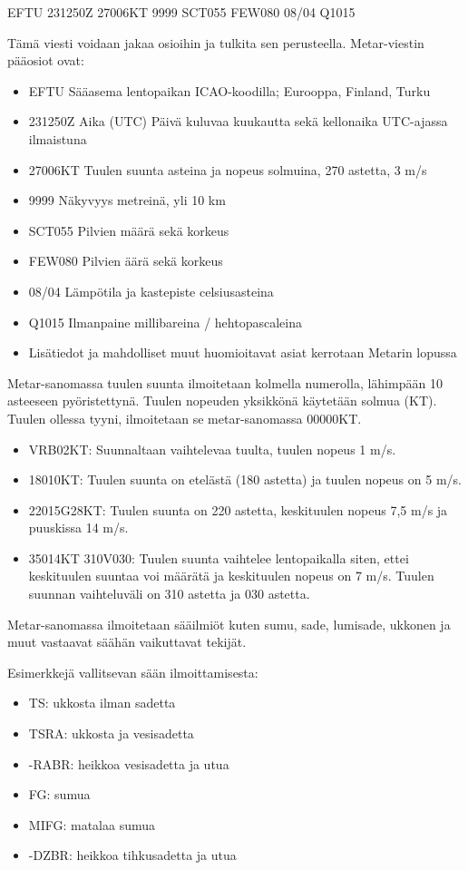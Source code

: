 EFTU 231250Z 27006KT 9999 SCT055 FEW080 08/04 Q1015 


Tämä viesti voidaan jakaa osioihin ja tulkita sen perusteella. Metar-viestin pääosiot ovat: 

\begin{itemize}
\item  EFTU Sääasema lentopaikan ICAO-koodilla; Eurooppa, Finland, Turku 
\item  231250Z Aika (UTC) Päivä kuluvaa kuukautta sekä kellonaika UTC-ajassa ilmaistuna  
\item  27006KT Tuulen suunta asteina ja nopeus solmuina, 270 astetta, 3 m/s  
\item  9999 Näkyvyys metreinä, yli 10 km 
\item  SCT055 Pilvien määrä sekä korkeus 
\item  FEW080 Pilvien äärä sekä korkeus  
\item  08/04 Lämpötila ja kastepiste celsiusasteina  
\item  Q1015 Ilmanpaine millibareina / hehtopascaleina  
\item  Lisätiedot ja mahdolliset muut huomioitavat asiat kerrotaan Metarin lopussa  
\end{itemize}

Metar-sanomassa tuulen suunta ilmoitetaan kolmella numerolla, lähimpään 10 asteeseen pyöristettynä. Tuulen nopeuden yksikkönä käytetään solmua (KT). Tuulen ollessa tyyni, ilmoitetaan se metar-sanomassa 00000KT. 

\begin{itemize}
\item  VRB02KT: Suunnaltaan vaihtelevaa tuulta, tuulen nopeus 1 m/s. 
\item  18010KT: Tuulen suunta on etelästä (180 astetta) ja tuulen nopeus on 5 m/s. 
\item  22015G28KT: Tuulen suunta on 220 astetta, keskituulen nopeus 7,5 m/s ja puuskissa 14 m/s. 
\item  35014KT 310V030: Tuulen suunta vaihtelee lentopaikalla siten, ettei keskituulen suuntaa voi määrätä ja keskituulen nopeus on 7 m/s. Tuulen suunnan vaihteluväli on 310 astetta ja 030 astetta. 
\end{itemize}

Metar-sanomassa ilmoitetaan sääilmiöt kuten sumu, sade, lumisade, ukkonen ja muut vastaavat säähän vaikuttavat tekijät.  


Esimerkkejä vallitsevan sään ilmoittamisesta: 

\begin{itemize}
\item  TS: ukkosta ilman sadetta 
\item  TSRA: ukkosta ja vesisadetta 
\item  -RABR: heikkoa vesisadetta ja utua 
\item  FG: sumua 
\item  MIFG: matalaa sumua 
\item  -DZBR: heikkoa tihkusadetta ja utua 
\end{itemize}

